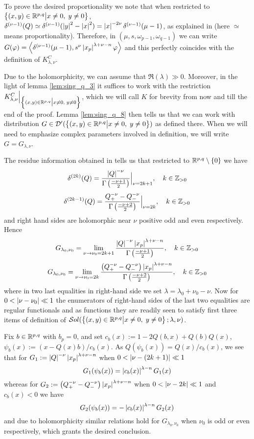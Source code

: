 \documentclass[10pt]{article} %
\newcommand{\D}{\mathcal{D}}
\theoremstyle{definition}
\theoremstyle{remark}
\begin{document}
\begin{myproof}
	To prove the desired proportionality we note that when restricted to $\Upp$, $\delta^{(\nu-1)}(Q)\simeq
	\delta^{(\nu-1)}(\myabs{y}^2-\myabs{x}^2)=\myabs{x}^{-2\nu}\delta^{(\nu-1)}(\mu-1)$, as explained in
	\cite[ch. III, sec 1.7]{gelfand1980distribution} (here $\simeq$ means proportionality). Therefore, in 
	$(\mu,s,\omega_{p-1},\omega_{q-1}
	)$ we can write $G(\phi)=\myabra{\delta^{(\nu-1)}(\mu-1),s^{\nu}\myabs{x_p}^{\lambda+\nu-n}\phi}$ and this
	perfectly coincides with the definition of $K_{\lambda,\nu}^C$.
\end{myproof}
\begin{myproof}
	Due to the holomorphicity, we can assume that $\Re(\lambda)\gg0$.
	Moreover, in the light of lemma \ref{lem:sing_q_3} it suffices to work with the restriction $K^C_{\lambda,\nu}\Big|_{\Upp}$,
	which we will call $K$ for brevity from now and till the end of the proof. Lemma \ref{lem:sing_q_8} then tells
	us that we can work with distribution $G\in\D'(\Upp)$ as defined there. When we will need to emphasize complex parameters
	involved in definition, we will write $G=G_{\lambda,\nu}$.

	The residue information obtained in \cite[ch. III, sec 2.2]{gelfand1980distribution} tells us that restricted to 
	$\R^{p,q}\setminus\left\{ 0 \right\}$ we have
	\[\delta^{(2k)}(Q)=\frac{\myabs{Q}^{-\nu}}{\Gamma\left( \frac{-\nu+1}{2} \right)}\Big|_{\nu=2k+1},\quad k\in\Z_{>0}\]
	\[\delta^{(2k-1)}(Q)=\frac{Q_+^{-\nu}-Q_-^{-\nu}}{\Gamma\left( \frac{-\nu+2}{2} \right)}\Big|_{\nu=2k},\quad k\in\Z_{>0}\]
	and right hand sides are holomorphic near $\nu$ positive odd and even respectively. Hence
	\[G_{\lambda_0,\nu_0}=\lim_{\nu\to\nu_0=2k+1}\frac{\myabs{Q}^{-\nu}\myabs{x_p}^{\lambda+\nu-n}}
		{\Gamma\left( \frac{-\nu+1}{2} \right)},\quad k\in\Z_{>0}\]
	\[G_{\lambda_0,\nu_0}=\lim_{\nu\to\nu_0=2k}\frac{\mybra{Q_+^{-\nu}-Q_-^{-\nu}}\myabs{x_p}^{\lambda+\nu-n}}
		{\Gamma\left( \frac{-\nu+2}{2} \right)},\quad k\in\Z_{>0}\]
	where in two last equalities in right-hand side we set $\lambda=\lambda_0+\nu_0-\nu$.
	Now for $0<\myabs{\nu-\nu_0}\ll1$ the enumerators of right-hand sides of the last two equalities are regular functionals
	and as functions they are readily seen to satisfy first three items of definition of $\sol[\Upp]$.

	Fix $b\in\R^{p,q}$ with $b_p=0$, and set $c_b(x):=1-2Q(b,x)+Q(b)Q(x)$, $\psi_b(x):=(x-Q(x)b)/c_b(x)$.
	As $Q(\psi_b(x))=Q(x)/c_b(x)$,
	we see that for $G_1:={\myabs{Q}^{-\nu}\myabs{x_p}^{\lambda+\nu-n}}$ when $0<\myabs{\nu-(2k+1)}\ll1$
	\[G_1(\psi_b(x))=\myabs{c_b(x)}^{\lambda-n}G_1(x)\]
	whereas for $G_2:={\mybra{Q_+^{-\nu}-Q_-^{-\nu}}\myabs{x_p}^{\lambda+\nu-n}}$ when $0<\myabs{\nu-2k}\ll1$
	and $c_b(x)<0$ we have
	\[G_2(\psi_b(x))=-\myabs{c_b(x)}^{\lambda-n}G_2(x)\]
	and due to holomorphicity similar relations hold for $G_{\lambda_0,\nu_0}$ when $\nu_0$ is odd or even respectively,
	which grants the desired conclusion.
\end{myproof}
\end{document}
